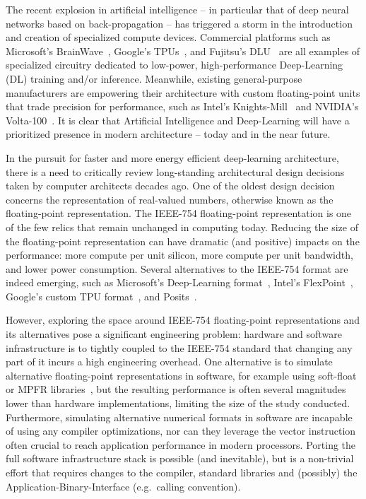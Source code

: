 \documentclass[techrep,english]{ipsj} %
\begin{document}
The recent explosion in artificial intelligence – in particular that of deep neural networks based on back-propagation – has triggered a storm in the introduction and creation of specialized compute devices.
Commercial platforms such as Microsoft’s BrainWave~\cite{msbrainwave}, Google’s TPUs~\cite{googletpu}, and Fujitsu’s DLU~\cite{fujitsudlu} are all examples of specialized circuitry dedicated to low-power, high-performance Deep-Learning (DL) training and/or inference.
Meanwhile, existing general-purpose manufacturers are empowering their architecture with custom floating-point units that trade precision for performance, such as Intel’s Knights-Mill~\cite{knm} and NVIDIA’s Volta-100~\cite{volta100}.
It is clear that Artificial Intelligence and Deep-Learning will have a prioritized presence in modern architecture -- today and in the near future.

In the pursuit for faster and more energy efficient deep-learning architecture, there is a need to critically review long-standing architectural design decisions taken by computer architects decades ago.
One of the oldest design decision concerns the representation of real-valued numbers, otherwise known as the floating-point representation.
The IEEE-754 floating-point representation is one of the few relics that remain unchanged in computing today.
Reducing the size of the floating-point representation can have dramatic (and positive) impacts on the performance: more compute per unit silicon, more compute per unit bandwidth, and lower power consumption.
Several alternatives to the IEEE-754 format are indeed emerging, such as Microsoft’s Deep-Learning format~\cite{msbrainwave}, Intel’s FlexPoint~\cite{intelflexpoint}, Google’s custom TPU format~\cite{tpuformat}, and Posits~\cite{posits}.

However, exploring the space around IEEE-754 floating-point representations and its alternatives pose a significant engineering problem: hardware and software infrastructure is to tightly coupled to the IEEE-754 standard that changing any part of it incurs a high engineering overhead.
One alternative is to simulate alternative floating-point representations in software, for example using soft-float or MPFR libraries~\cite{softfloat}, but the resulting performance is often several magnitudes lower than hardware implementations, limiting the size of the study conducted.
Furthermore, simulating alternative numerical formats in software are incapable of using any compiler optimizations, nor can they leverage the vector instruction often crucial to reach application performance in modern processors.
Porting the full software infrastructure stack is possible (and inevitable), but is a non-trivial effort that requires changes to the compiler, standard libraries and (possibly) the Application-Binary-Interface (e.g.\ calling convention).
\end{document}
